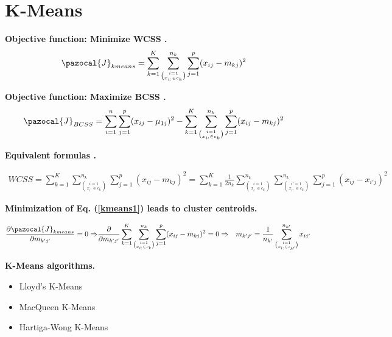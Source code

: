 \documentclass[12pt]{article}
\renewcommand\cite{\citep}  %
\newcommand{\CJ}{\pazocal{J}}
\begin{document}
\cleardoublepage

\section{K-Means}

\noindent \textbf{Objective function: Minimize WCSS \cite{jain2010data}.}
\begin{align}\label{kmeans1}
\CJ_{kmeans} &= \sum_{k=1}^{K}\sum_{\binom{i=1}{x_{i:} \in c_k}}^{n_k} \sum_{j=1}^{p} (x_{ij}-m_{kj})^2	
\end{align}	

\noindent \textbf{Objective function: Maximize BCSS \cite{witten2010framework}.}
\begin{align}\label{kmeans2}
\CJ_{BCSS} &= \sum_{i=1}^{n}\sum_{j=1}^{p}(x_{ij}-{\mu}_{1j})^2 - \sum_{k=1}^{K}\sum_{\binom{i=1}{x_{i:} \in c_k}}^{n_k}\sum_{j=1}^{p}(x_{ij}-m_{kj})^2	
\end{align}	

\noindent \textbf{Equivalent formulas \cite{witten2010framework}.}

\begin{align}\label{prrof1a}
WCSS = 
\sum_{k=1}^{K} \sum_{\binom{i=1}{x_{i:} \in c_k}}^{n_k} \sum_{j=1}^{p} (x_{ij}-m_{kj})^2	
= \sum_{k=1}^{K} \frac{1}{2n_k}\sum_{\binom{i=1}{x_{i:} \in c_k}}^{n_k} \sum_{\binom{i'=1}{x_{i':} \in c_k}}^{n_k} \sum_{j=1}^{p} (x_{ij}-x_{i'j})^2
\end{align}	

\noindent \textbf{Minimization of Eq. (\ref{kmeans1}) leads to cluster centroids.}

\begin{align}
\frac{\partial \CJ_{kmeans}}{\partial m_{k'j'}} = 0 \Rightarrow 
&\frac{\partial}{\partial m_{k'j'}} \sum_{k=1}^{K}\sum_{\binom{i=1}{x_{i:} \in c_k}}^{n_k} \sum_{j=1}^{p} (x_{ij}-m_{kj})^2 = 0 \Rightarrow 
&m_{k'j'} = \frac{1}{n_{k'}}\sum_{\binom{i=1}{x_{i:} \in c_{k'}}}^{n_{k'}} x_{ij'}
\end{align}

\noindent\textbf{K-Means algorithms.}
\begin{itemize}
	\item Lloyd's K-Means \cite{lloyd1982least, jain2010data}
	\item MacQueen K-Means \cite{macqueen1967some}
	\item Hartiga-Wong K-Means \cite{hartigan1979algorithm,slonim2013hartigan}
\end{itemize}
\end{document}
